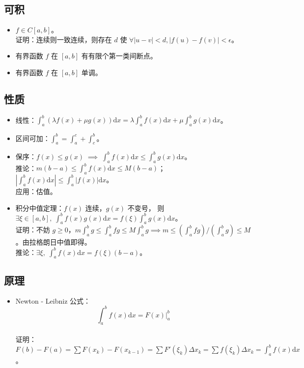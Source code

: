 \documentclass[12pt, a4paper, UTF8, openany]{ctexbook}
\newcommand{\dif}{\mathrm{d}}
\begin{document}
        \subsection{可积}
        \begin{itemize}
            \item $f\in C[a, b]$。\\
            证明：连续则{\heiti 一致连续}，则存在 $d$ 使 $\forall |u - v| < d, |f(u) - f(v)| < \epsilon$。
            \item {\heiti 有界}函数 $f$ 在 $[a, b]$ 有有限个第一类间断点。
            \item {\heiti 有界}函数 $f$ 在 $[a, b]$ 单调。
        \end{itemize}
        
        \subsection{性质}
        \begin{itemize}
            \item 线性：$\int_{a}^{b} (\lambda f(x) + \mu g(x))\dif x = \lambda\int_{a}^{b}f(x)\dif x + \mu\int_{a}^{b}g(x)\dif x$。
            \item 区间可加：$\int_{a}^{b} = \int_{a}^{c} + \int_{c}^{b}$。
            \item 保序：$f(x) \leqslant g(x) \; \implies \; \int_{a}^{b} f(x)\dif x \leqslant \int_{a}^{b} g(x)\dif x$。\\
                推论：$m(b - a) \leqslant \int_{a}^{b} f(x)\dif x \leqslant M(b - a)$；
                $|\int_{a}^{b} f(x)\dif x| \leqslant \int_{a}^{b} |f(x)|\dif x$。\\
                {\heiti 应用}：估值。
            \item 积分中值定理：$f(x)$ {\heiti 连续}，$g(x)$ 不变号，
                则 $\exists \xi \in [a, b], \; \int_{a}^{b} f(x)g(x)\dif x = f(\xi)\int_{a}^{b} g(x)\dif x$。\\
                证明：不妨 $g \geqslant 0$，$m\int_{a}^{b} g \leqslant \int_{a}^{b} fg \leqslant M\int_{a}^{b} g 
                \implies m \leqslant (\int_{a}^{b} fg) / (\int_{a}^{b} g) \leqslant M$。由拉格朗日中值即得。\\
                推论：$\exists \xi, \; \int_{a}^{b} f(x)\dif x = f(\xi)(b - a)$。
        \end{itemize}

        \subsection{原理}
        \begin{itemize}
            \item Newton - Leibniz 公式：$$\int_{a}^{b} f(x)\dif x = F(x)|_a^b$$\\
                证明：$F(b) - F(a) = \sum F(x_k) - F(x_{k - 1}) = \sum F'(\xi_k)\Delta x_k 
                    = \sum f(\xi_k)\Delta x_k = \int_{a}^{b} f(x)\dif x$。
        \end{itemize}
        
\end{document}
